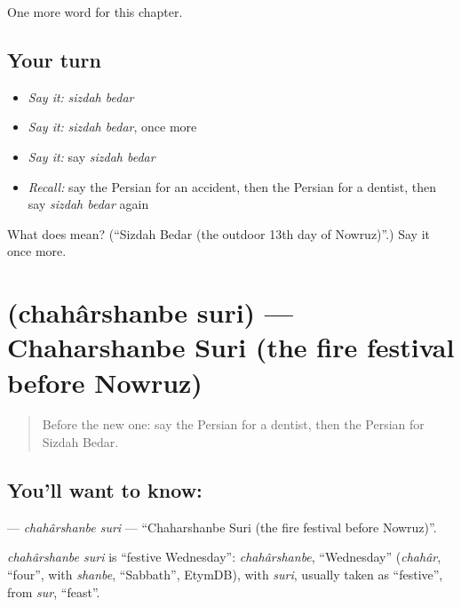 \begin{grammarlens}[title={What you've built}]
One more word for this chapter.
\end{grammarlens}

\subsection*{Your turn}
\begin{itemize}
\raggedright
  \item \emph{Say it:} \emph{sizdah bedar}
  \item \emph{Say it:} \emph{sizdah bedar}, once more
  \item \emph{Say it:} say \emph{sizdah bedar}
  \item \emph{Recall:} say the Persian for an accident, then the Persian for a dentist, then say \emph{sizdah bedar} again
\end{itemize}

\begin{tcolorbox}[breakable,colback=teal!4,colframe=teal!35!black,title={Before you move on}]
What does   mean? (\textquotedblleft{}Sizdah Bedar (the outdoor 13th day of Nowruz)\textquotedblright{}.) Say it once more.
\end{tcolorbox}
\section[\texorpdfstring{\fa{چهارشنبه} \fa{سوری} (chahârshanbe suri)}{چهارشنبه سوری (chahârshanbe suri)}]{  (chahârshanbe suri) — Chaharshanbe Suri (the fire festival before Nowruz)}

\label{lesson:FA-C228-chaharshanbe-suri}



\begin{quote}
Before the new one: say the Persian for a dentist, then the Persian for Sizdah Bedar.
\end{quote}

\subsection*{You'll want to know:  }
\textbf{ } — \emph{chahârshanbe suri} — \textquotedblleft{}Chaharshanbe Suri (the fire festival before Nowruz)\textquotedblright{}.

\begin{cousinweb}
\emph{chahârshanbe suri} is \textquotedblleft{}festive Wednesday\textquotedblright{}: \emph{chahârshanbe}, \textquotedblleft{}Wednesday\textquotedblright{} (\emph{chahâr}, \textquotedblleft{}four\textquotedblright{}, with \emph{shanbe}, \textquotedblleft{}Sabbath\textquotedblright{}, EtymDB), with \emph{suri}, usually taken as \textquotedblleft{}festive\textquotedblright{}, from \emph{sur}, \textquotedblleft{}feast\textquotedblright{}.
\end{cousinweb}

